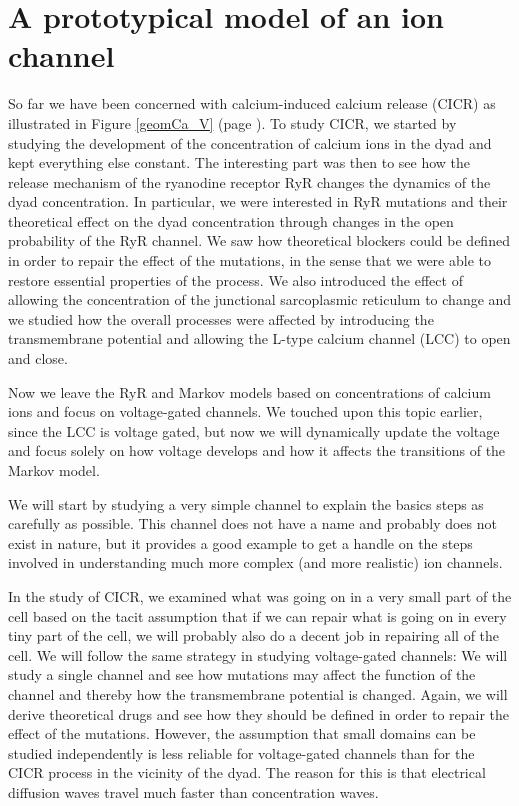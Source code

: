 
\chapter{A prototypical model of an ion channel \label{prototype}}

So far we have been concerned with calcium-induced calcium release (CICR) as
illustrated in Figure \ref{geomCa_V} (page \pageref{geomCa_V}). To
study CICR, we started by studying the development of the concentration of
calcium ions in the dyad and kept everything else constant. The interesting
part was then to see how the release mechanism of the ryanodine receptor RyR changes 
the dynamics of the dyad concentration. In particular, we were interested in RyR 
mutations and their theoretical effect on the dyad concentration through changes in the
open probability of the RyR channel. We saw how theoretical blockers could be
defined in order to repair the effect of the mutations, in the sense that we
were able to restore essential properties of the process. We also introduced the
effect of allowing the concentration of the junctional sarcoplasmic reticulum 
 to change and we studied how the overall processes were affected by introducing 
 the transmembrane potential and allowing the L-type calcium channel (LCC) to open and close. 

Now we leave the RyR and Markov
models based on concentrations of calcium ions and focus on
voltage-gated channels. We touched upon this topic earlier, since the LCC
is voltage gated, but now we will dynamically update the voltage and focus
solely on how voltage develops and how it affects the transitions of the
Markov model.

We will start by studying a very simple channel to explain
the basics steps as carefully as possible. This channel does not have a name and
probably does not exist in nature, but it provides a good example to
get a handle on the steps involved in understanding much more complex (and more
realistic) ion channels. 

In the study of CICR, we examined what was going on in a very small part of the 
cell based on the tacit assumption that if we can repair what is going on in 
every tiny part of the cell, we will probably also do a decent job in repairing all of the cell. We will follow the same strategy in studying voltage-gated channels: We will study a single channel and see how mutations may affect the 
function of the channel and thereby how the transmembrane potential is changed. Again, we will derive 
theoretical drugs and see how they should be defined in order to repair the effect of the mutations. However, the assumption that small domains can be studied independently is less reliable for voltage-gated channels than for 
the CICR process in the vicinity of the dyad. The reason for this is that electrical diffusion waves travel much faster than concentration waves. %

